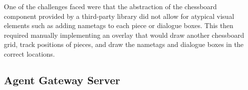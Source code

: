\documentclass[conference]{IEEEtran}
\begin{document}
One of the challenges faced were that the abstraction of the chessboard component provided by a third-party library did not allow for atypical visual elements such as adding nametags to each piece or dialogue boxes. This then required manually implementing an overlay that would draw another chessboard grid, track positions of pieces, and draw the nametags and dialogue boxes in the correct locations.

\subsection{Agent Gateway Server}






\vspace{12pt}
\end{document}
